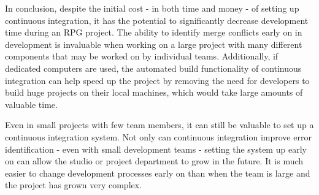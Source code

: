 \documentclass{scrartcl}
\begin{document}
In conclusion, despite the initial cost - in both time and money - of setting up continuous integration, it has the potential to significantly decrease development time during an RPG project. The ability to identify merge conflicts early on in development is invaluable when working on a large project with many different components that may be worked on by individual teams. Additionally, if dedicated computers are used, the automated build functionality of continuous integration can help speed up the project by removing the need for developers to build huge projects on their local machines, which would take large amounts of valuable time. \cite{gamasutraCIprocess}

Even in small projects with few team members, it can still be valuable to set up a continuous integration system. Not only can continuous integration improve error identification - even with small development teams - setting the system up early on can allow the studio or project department to grow in the future. It is much easier to change development processes early on than when the team is large and the project has grown very complex.




\end{document}
